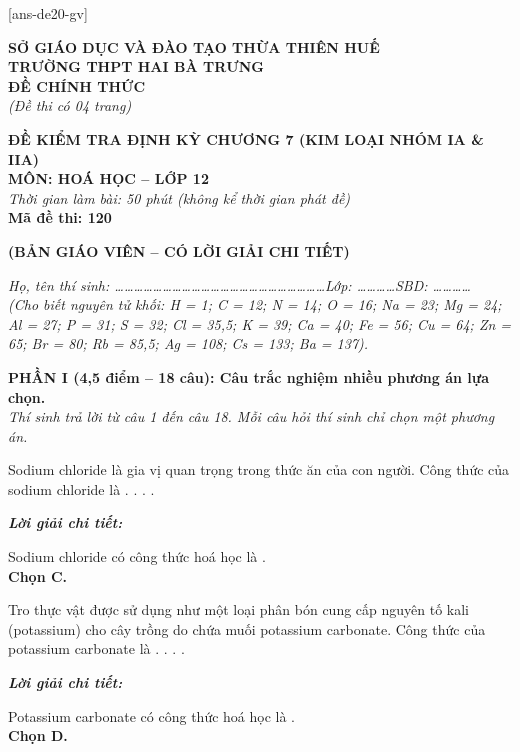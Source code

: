 \documentclass[11pt,a4paper]{article}
\def\loigiai#1{
\par\begingroup\color{blue!80!black}\small
\noindent\textbf{\textit{Lời giải chi tiết:}}\par
#1\par\endgroup}
\begin{document}
[ans-de20-gv]

\noindent
\begin{minipage}[t]{0.48\textwidth}
	\textbf{SỞ GIÁO DỤC VÀ ĐÀO TẠO THỪA THIÊN HUẾ}\\
	\textbf{TRƯỜNG THPT HAI BÀ TRƯNG}\\
	\textbf{ĐỀ CHÍNH THỨC}\\
	\textit{(Đề thi có 04 trang)}
\end{minipage}\hfill
\begin{minipage}[t]{0.48\textwidth}
	\raggedleft
	\textbf{\color{mainGreen}ĐỀ KIỂM TRA ĐỊNH KỲ CHƯƠNG 7 (KIM LOẠI NHÓM IA \& IIA)}\\
	\textbf{MÔN: HOÁ HỌC -- LỚP 12}\\
	\textit{Thời gian làm bài: 50 phút (không kể thời gian phát đề)}\\
	\textbf{Mã đề thi: 120}
\end{minipage}


\vspace{0.1cm}
\begin{center}
	\textbf{\color{hfRed}\Large (BẢN GIÁO VIÊN -- CÓ LỜI GIẢI CHI TIẾT)}
\end{center}

\vspace{1pt}
\noindent\textit{Họ, tên thí sinh: \dots\dots\dots\dots\dots\dots\dots\dots\dots\dots\dots\dots\dots\dots\dots\dots\dots\dots\dots\dots\dots\dots Lớp: \dots\dots\dots\dots SBD: \dots\dots\dots\dots}\\
\noindent\textit{(Cho biết nguyên tử khối: H = 1; C = 12; N = 14; O = 16; Na = 23; Mg = 24; Al = 27; P = 31; S = 32; Cl = 35,5; K = 39; Ca = 40; Fe = 56; Cu = 64; Zn = 65; Br = 80; Rb = 85,5; Ag = 108; Cs = 133; Ba = 137).}

\vspace{1pt}
\noindent
\textbf{PHẦN I (4,5 điểm -- 18 câu): Câu trắc nghiệm nhiều phương án lựa chọn.}\\
\textit{Thí sinh trả lời từ câu 1 đến câu 18. Mỗi câu hỏi thí sinh chỉ chọn một phương án.}

\begin{ex}
Sodium chloride là gia vị quan trọng trong thức ăn của con người. Công thức của sodium chloride là
\choice
{.}
{.}
{\True {}.}
{.}
\loigiai{
Sodium chloride có công thức hoá học là \ce{NaCl}.\\
\textbf{Chọn C.}}
\end{ex}

\begin{ex}
Tro thực vật được sử dụng như một loại phân bón cung cấp nguyên tố kali (potassium) cho cây trồng do chứa muối potassium carbonate. Công thức của potassium carbonate là
\choice
{.}
{.}
{.}
{\True {}.}
\loigiai{
Potassium carbonate có công thức hoá học là \ce{K2CO3}.\\
\textbf{Chọn D.}}
\end{ex}
\end{document}
